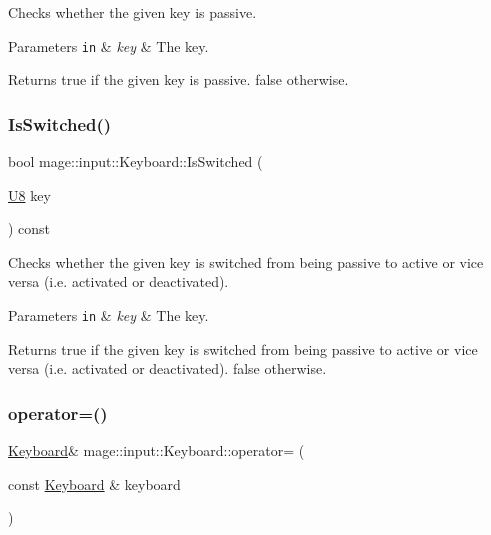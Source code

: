 Checks whether the given key is passive.


\begin{DoxyParams}[1]{Parameters}
\mbox{\tt in}  & {\em key} & The key. \\
\hline
\end{DoxyParams}
\begin{DoxyReturn}{Returns}
{\ttfamily true} if the given key is passive. {\ttfamily false} otherwise. 
\end{DoxyReturn}
\mbox{\label{classmage_1_1input_1_1_keyboard_ac6d4bcf6d8f363a74b684303aa8c5993}} 
\subsubsection{\texorpdfstring{Is\+Switched()}{IsSwitched()}}
{\footnotesize\ttfamily bool mage\+::input\+::\+Keyboard\+::\+Is\+Switched (\begin{DoxyParamCaption}\item[{\mbox{\hyperlink{namespacemage_a30677c03d683c4c35630c25f6ff3fb7f}{U8}}}]{key }\end{DoxyParamCaption}) const\hspace{0.3cm}{\ttfamily [noexcept]}}

Checks whether the given key is switched from being passive to active or vice versa (i.\+e. activated or deactivated).


\begin{DoxyParams}[1]{Parameters}
\mbox{\tt in}  & {\em key} & The key. \\
\hline
\end{DoxyParams}
\begin{DoxyReturn}{Returns}
{\ttfamily true} if the given key is switched from being passive to active or vice versa (i.\+e. activated or deactivated). {\ttfamily false} otherwise. 
\end{DoxyReturn}
\mbox{\label{classmage_1_1input_1_1_keyboard_a8a06eeb906625f100928f3fe2d17cf9d}} 
\subsubsection{\texorpdfstring{operator=()}{operator=()}\hspace{0.1cm}{\footnotesize\ttfamily [1/2]}}
{\footnotesize\ttfamily \mbox{\hyperlink{classmage_1_1input_1_1_keyboard}{Keyboard}}\& mage\+::input\+::\+Keyboard\+::operator= (\begin{DoxyParamCaption}\item[{const \mbox{\hyperlink{classmage_1_1input_1_1_keyboard}{Keyboard}} \&}]{keyboard }\end{DoxyParamCaption})\hspace{0.3cm}{\ttfamily [delete]}}

